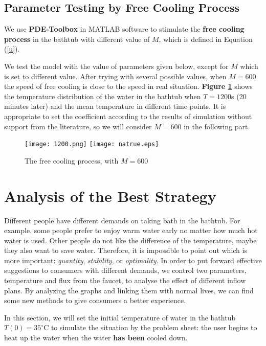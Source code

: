 \documentclass[12pt]{article}
\begin{document}
\subsection{Parameter Testing by Free Cooling Process}
We use \textbf{PDE-Toolbox} in MATLAB software to stimulate the \textbf{free cooling process} in the
bathtub with different value of $M$, which is defined in Equation (\ref{u}).

We test the model with the value of parameters given below, except for $M$ which is set to different
value. After trying with several possible values, when $M=600$ the speed of free cooling is close to
the speed in real situation. \textbf{Figure \ref{nt}} shows the temperature distribution of the
water in the bathtub when $T=1200$s (20 minutes later) and the mean temperature in different time
points. It is appropriate to set the coefficient according to the results of simulation without
support from the literature, so we will consider $M=600$ in the following part.

\begin{figure}[!htbp]
\small
\centering
\texttt{[image: 1200.png]}
\texttt{[image: natrue.eps]}
\caption{The free cooling process, with $M=600$}\label{nt}
\end{figure}

\section{Analysis of the Best Strategy}
Different people have different demands on taking bath in the bathtub. For example, some people
prefer to enjoy warm water early no matter how much hot water is used. Other people do not like the
difference of the temperature, maybe they also want to save water. Therefore, it is impossible to
point out which is more important: \emph{quantity}, \emph{stability}, or \emph{optimality}. In order
to put forward effective suggestions to consumers with different demands, we control two parameters,
temperature and flux from the faucet, to analyse the effect of different inflow plans. By analyzing
the graphs and linking them with normal lives, we can find some new methods to give consumers a
better experience.

In this section, we will set the initial temperature of water in the bathtub $T(0)=35^\circ$C to
simulate the situation by the problem sheet: the user begins to heat up the water when the water
\textbf{has been} cooled down.
\end{document}
